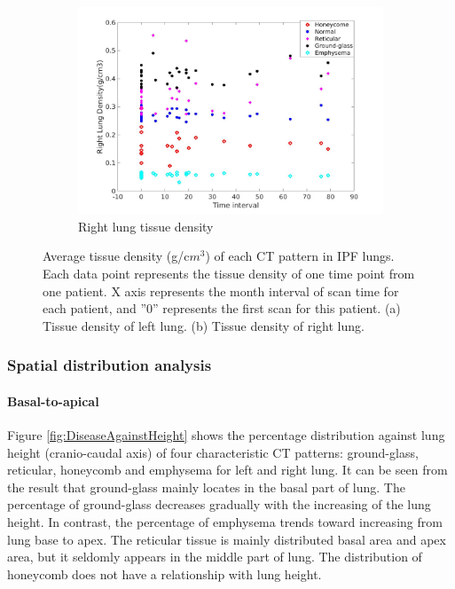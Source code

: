\begin{figure}[H]
\begin{subfigure}{.7\linewidth}
  \includegraphics[width=\linewidth,trim={{.0\wd0} {.0\wd0} {.0\wd0} {.0\wd0}},clip]{QuantitativeAnalysis/Image/RightLungDensity.jpg}
  \caption{Right lung tissue density}
  \label{fig:LungDensity-b} 
\end{subfigure}
\caption{Average tissue density (g/c$m^3$) of each CT pattern in IPF lungs. Each data point represents the tissue density of one time point from one patient. X axis represents the month interval of scan time for each patient, and ''0'' represents the first scan for this patient. (a) Tissue density of left lung. (b) Tissue density of right lung.}
\label{fig:LungDensity}
\end{figure}

\subsubsection{Spatial distribution analysis}
\paragraph{Basal-to-apical}
Figure \ref{fig:DiseaseAgainstHeight} shows the percentage distribution against lung height (cranio-caudal axis) of four characteristic CT patterns: ground-glass, reticular, honeycomb and emphysema for left and right lung. It can be seen from the result that ground-glass mainly locates in the basal part of lung. The percentage of ground-glass decreases gradually with the increasing of the lung height. In contrast, the percentage of emphysema trends toward increasing from lung base to apex. The reticular tissue is mainly distributed basal area and apex area, but it seldomly appears in the middle part of lung. The distribution of honeycomb does not have a relationship with lung height.
\newpage

